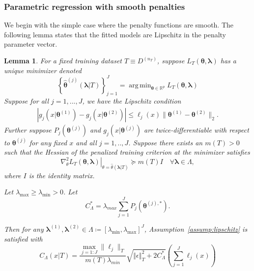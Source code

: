 \documentclass[12pt]{article} %
\newtheorem{lemma}{Lemma}
\theoremstyle{definition}
\DeclareMathOperator*{\argmin}{arg\,min}
\begin{document}
\subsubsection{Parametric regression with smooth penalties}
\label{sec:param_smooth}
We begin with the simple case where the penalty functions are smooth. The following lemma states that the fitted models are Lipschitz in the penalty parameter vector.
\begin{lemma}
	\label{lemma:param_add}
	For a fixed training dataset $T \equiv D^{(n_T)}$, suppose $L_T \left (\boldsymbol{\theta}, \boldsymbol{\lambda} \right)$ has a unique minimizer denoted
	\begin{equation}
	\label{eq:param_add_estimator}
	\left\{
	\hat{\boldsymbol{\theta}}^{(j)}\left (\boldsymbol{\lambda} | T \right )
	\right\}_{j=1}^J =
	\argmin_{\boldsymbol{\theta} \in \mathbb{R}^p} L_T \left (\boldsymbol{\theta}, \boldsymbol{\lambda} \right)
	\end{equation}
	Suppose for all $j = 1,...,J$, we have the Lipschitz condition
	\begin{align}
	\left|
	g_j\left(x|\boldsymbol{\theta}^{(1)}\right)
	-g_j\left(x|\boldsymbol{\theta}^{(2)}\right)
	\right|
	\le
	\ell_j (x)
	\|\boldsymbol{\theta}^{(1)}-\boldsymbol{\theta}^{(2)}\|_{2}.
	\end{align}
	Further suppose $P_j(\boldsymbol{\theta}^{(j)})$ and $g_j(x | \boldsymbol{\theta}^{(j)})$ are twice-differentiable with respect to $\boldsymbol{\theta}^{(j)}$ for any fixed $x$ and all $j=1,..,J$.
	Suppose there exists an $m(T) > 0$ such that the Hessian of the penalized training criterion at the minimizer satisfies
	\begin{equation}
	\left . \nabla_{\theta}^2 L_T \left (\boldsymbol{\theta}, \boldsymbol{\lambda} \right) \right |_{\theta = \hat{\theta}(\boldsymbol{\lambda} | T )} \succeq m(T) I \quad \forall \boldsymbol{\lambda} \in \Lambda,
	\label{eq:smooth_pos_def}
	\end{equation}
	where $I$ is the identity matrix.
	
	\noindent
	Let $\lambda_{\max} \ge \lambda_{\min} > 0$. Let
	\begin{equation}
	C^*_{\Lambda} = \lambda_{max}\sum_{j=1}^{J} P_{j}(\boldsymbol{\theta}^{(j),*}).
	\end{equation}
	
	\noindent
	Then for any $\boldsymbol{\lambda}^{(1)}, \boldsymbol{\lambda}^{(2)} \in \Lambda \coloneqq \left [ \lambda_{\min}, \lambda_{\max} \right ]^J$,
	Assumption~\ref{assump:lipschitz} is satisfied with
	\begin{equation}
	\label{eq:param_add_lipschitz}
	C_\Lambda(x | T) =
	\frac{\max_{j=1:J} \|\ell_j\|_T}{m(T) \lambda_{min}}
	\sqrt{\left\Vert \epsilon \right \Vert_T^2 + 2 C^*_{\Lambda}}
	\left(
	\sum_{j=1}^J \ell_j(x)
	\right)
	\end{equation}
\end{lemma}
\end{document}

